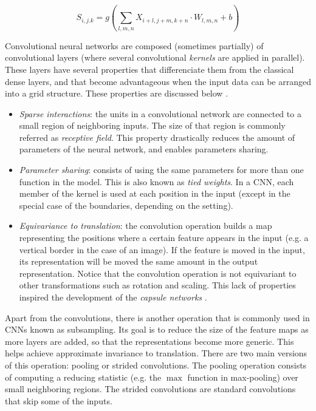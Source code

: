 \begin{equation}
	\label{eq:cnnformula}
	S_{i,j.k} = g\left(\sum_{l,m,n}{X_{i+l, j+m, k+n} \cdot W_{l,m,n} + b}\right)
\end{equation}

Convolutional neural networks are composed (sometimes partially) of convolutional layers (where several convolutional \textit{kernels} are applied in parallel). These layers have several properties that differenciate them from the classical dense layers, and that become advantageous when the input data can be arranged into a grid structure. These properties are discussed below \autocite{Goodfellow2016}.


\begin{itemize}
	\item \textit{Sparse interactions}: the units in a convolutional network are connected to a small region of neighboring inputs. The size of that region is commonly referred as \textit{receptive field}. This property drastically reduces the amount of parameters of the neural network, and enables parameters sharing.
	\item \textit{Parameter sharing}: consists of using the same parameters for more than one function in the model. This is also known as \textit{tied weights}. In a CNN, each member of the kernel is used at each position in the input (except in the special case of the boundaries, depending on the setting).
	\item \textit{Equivariance to translation}: the convolution operation builds a map representing the positions where a certain feature appears in the input (e.g. a vertical border in the case of an image). If the feature is moved in the input, its representation will be moved the same amount in the output representation. Notice that the convolution operation is not equivariant to other transformations such as rotation and scaling. This lack of properties inspired the development of the \textit{capsule networks} \autocite{sabour2017}.
\end{itemize}

Apart from the convolutions, there is another operation that is commonly used in CNNs known as subsampling. Its goal is to reduce the size of the feature maps as more layers are added, so that the representations become more generic. This helps achieve approximate invariance to translation. There are two main versions of this operation: pooling or strided convolutions. The pooling operation \autocite{Goodfellow2016} consists of computing a reducing statistic (e.g. the $\max$ function in max-pooling) over small neighboring regions. The strided convolutions \autocite{riadh2020} are standard convolutions that skip some of the inputs.

